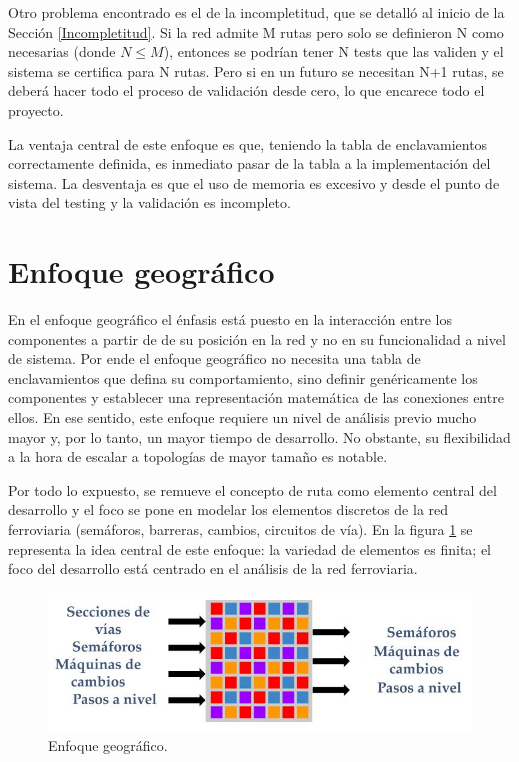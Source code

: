 	Otro problema encontrado es el de la incompletitud, que se detalló al inicio de la Sección \ref{Incompletitud}. Si la red admite M rutas pero solo se definieron N como necesarias (donde $N \leq M$), entonces se podrían tener N tests que las validen y el sistema se certifica para N rutas. Pero si en un futuro se necesitan N+1 rutas, se deberá hacer todo el proceso de validación desde cero, lo que encarece todo el proyecto.
			
	La ventaja central de este enfoque es que, teniendo la tabla de enclavamientos correctamente definida, es inmediato pasar de la tabla a la implementación del sistema. La desventaja es que el uso de memoria es excesivo y desde el punto de vista del testing y la validación es incompleto.			
					
\section{Enfoque geográfico}

	En el enfoque geográfico el énfasis está puesto en la interacción entre los componentes a partir de de su posición en la red y no en su funcionalidad a nivel de sistema. Por ende el enfoque geográfico no necesita una tabla de enclavamientos que defina su comportamiento, sino definir genéricamente los componentes y establecer una representación matemática de las conexiones entre ellos. En ese sentido, este enfoque requiere un nivel de análisis previo mucho mayor y, por lo tanto, un mayor tiempo de desarrollo. No obstante, su flexibilidad a la hora de escalar a topologías de mayor tamaño es notable.
	
	Por todo lo expuesto, se remueve el concepto de ruta como elemento central del desarrollo y el foco se pone en modelar los elementos discretos de la red ferroviaria (semáforos, barreras, cambios, circuitos de vía). En la figura \ref{fig:Enfoque_Geografico} se representa la idea central de este enfoque: la variedad de elementos es finita; el foco del desarrollo está centrado en el análisis de la red ferroviaria.
	
		\begin{figure}[h]
		\centering
			\includegraphics[scale=.55]{./Figures/Geografico}
			\caption{Enfoque geográfico.}
			\label{fig:Enfoque_Geografico}
		\end{figure}


